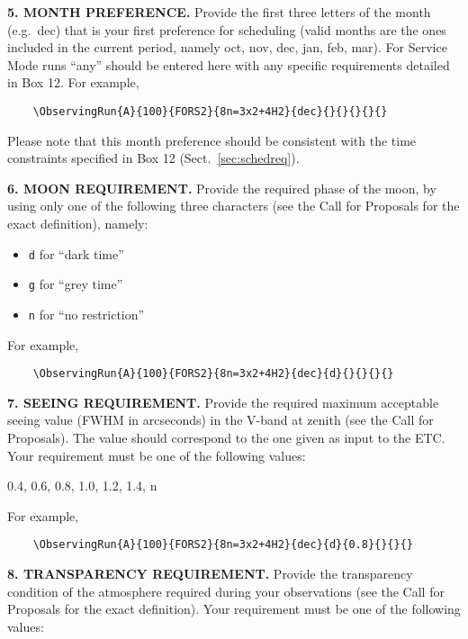 \documentclass{article}
\begin{document}
\medskip

{\bf 5. MONTH PREFERENCE.} Provide the first three letters of the
month (e.g.\ dec) that is your first preference for
scheduling (valid months are the ones included in the current period,
namely oct, nov, dec, jan,
feb, mar).
For Service Mode runs ``any'' should be entered here with any specific 
requirements detailed in Box 12. 
For example,
\begin{verbatim}
    \ObservingRun{A}{100}{FORS2}{8n=3x2+4H2}{dec}{}{}{}{}{}
\end{verbatim}
Please note that this month preference should be consistent with the time
constraints specified in Box 12 (Sect.~\ref{sec:schedreq}).

\medskip

{\bf 6. MOON REQUIREMENT.} Provide the required phase of the moon, by
using only one of the following three characters (see the Call for
Proposals for the exact definition), namely:
\begin{itemize}
\item {\tt d} for ``dark time''
\item {\tt g} for ``grey time''
\item {\tt n} for ``no restriction''
\end{itemize}
For example,
\begin{verbatim}
    \ObservingRun{A}{100}{FORS2}{8n=3x2+4H2}{dec}{d}{}{}{}{}
\end{verbatim}

\medskip

{\bf 7. SEEING REQUIREMENT.} Provide the required maximum acceptable seeing value (FWHM in arcseconds) in the V-band at zenith (see the Call for Proposals). The value should correspond to the one given as input to the ETC.  Your requirement must be one of the following values:

\smallskip

0.4, 0.6, 0.8, 1.0, 1.2, 1.4, n

\smallskip

For example,
\begin{verbatim}
    \ObservingRun{A}{100}{FORS2}{8n=3x2+4H2}{dec}{d}{0.8}{}{}{}
\end{verbatim}

\medskip

{\bf 8. TRANSPARENCY REQUIREMENT.} Provide the transparency
condition of the atmosphere required during your observations (see the
Call for Proposals for the exact definition). Your requirement must
be one of the following values:
\end{document}

